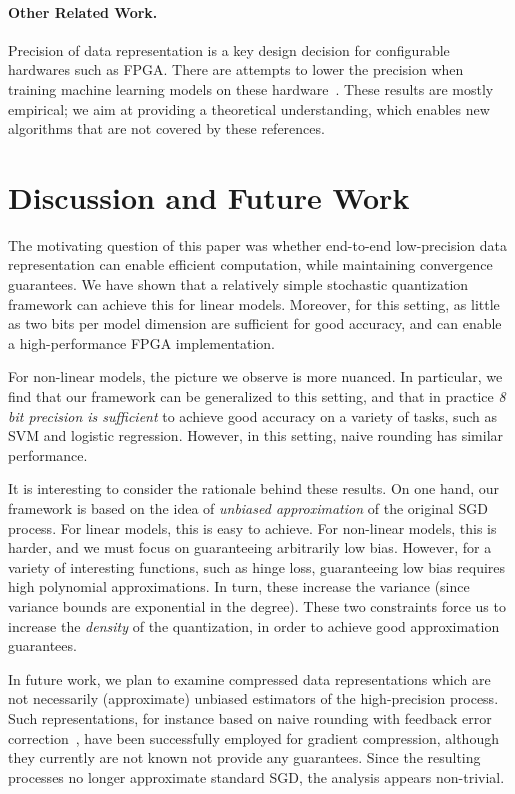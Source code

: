 \documentclass{article}
\begin{document}
\paragraph{Other Related Work.} Precision of data
representation is a key design decision
for configurable hardwares such as FPGA. There are attempts to
lower the precision when training machine learning models
on these hardware~\cite{Kim:2011:ICASSP}. 
These results are mostly empirical; we
aim at providing a theoretical understanding, which 
enables new algorithms that are not covered 
by these references.

\vspace{-1em}
\section{Discussion and Future Work}
\label{sec:conclusions}

The motivating question of this paper was whether end-to-end low-precision data representation can enable efficient computation, while maintaining convergence guarantees. 
We have shown that a relatively simple stochastic quantization framework can achieve this for linear models. 
Moreover, for this setting, as little as two bits per model dimension are sufficient for good accuracy, and can enable a high-performance FPGA implementation.  

For non-linear models, the picture we observe is more nuanced. 
In particular, we find that our framework can be generalized to this setting, and that in practice \emph{8 bit precision is sufficient} to achieve good accuracy on a variety of tasks, such as SVM and logistic regression. 
However, in this setting, naive rounding has similar performance. 

It is interesting to consider the rationale behind these results. On one hand, our framework is based on the idea of \emph{unbiased approximation} of the original SGD process. For linear models, this is easy to achieve. For non-linear models, this is harder, and we must focus on guaranteeing arbitrarily low bias. 
However, for a variety of interesting functions, such as hinge loss, guaranteeing low bias requires high polynomial approximations. In turn, these increase the variance (since variance bounds are exponential in the degree). These two constraints force us to increase the \emph{density} of the quantization, in order to achieve good approximation guarantees. 

In future work, we plan to examine compressed data representations which are not necessarily (approximate) unbiased estimators of the high-precision process. 
Such representations, for instance based on naive rounding with feedback error correction~\cite{1BitSGD}, have been successfully employed for gradient compression, although they currently are not known not provide any guarantees. Since the resulting processes no longer approximate standard SGD, the analysis appears non-trivial. 
\end{document}
